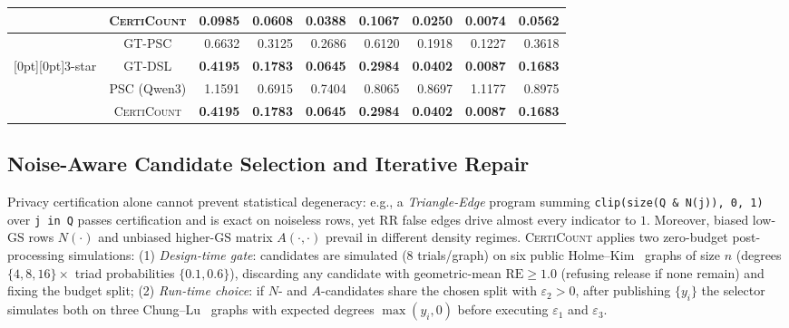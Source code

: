 \documentclass[conference]{IEEEtran}
\theoremstyle{ieeeitalic}
\newcommand{\GS}{\mathrm{GS}}
\newcommand{\RE}{\mathrm{RE}}
\begin{document}
\begin{table}[t]
\begin{tabular}{ccrrrrrrr}
 & \textsc{CertiCount} & \textbf{0.0985} & \textbf{0.0608} & \textbf{0.0388} & \textbf{0.1067} & \textbf{0.0250} & \textbf{0.0074} & \textbf{0.0562} \\
\midrule
 & GT-PSC & 0.6632 & 0.3125 & 0.2686 & 0.6120 & 0.1918 & 0.1227 & 0.3618 \\
\raisebox{-1.2ex}[0pt][0pt]{3-star} & GT-DSL & \textbf{0.4195} & \textbf{0.1783} & \textbf{0.0645} & \textbf{0.2984} & \textbf{0.0402} & \textbf{0.0087} & \textbf{0.1683} \\
 & PSC (Qwen3) & 1.1591 & 0.6915 & 0.7404 & 0.8065 & 0.8697 & 1.1177 & 0.8975 \\
 & \textsc{CertiCount} & \textbf{0.4195} & \textbf{0.1783} & \textbf{0.0645} & \textbf{0.2984} & \textbf{0.0402} & \textbf{0.0087} & \textbf{0.1683} \\
\bottomrule
\end{tabular}
\par{}
\vspace{-4pt}
\end{table}

\subsection{Noise-Aware Candidate Selection and Iterative Repair}
\label{sec:selection}

Privacy certification alone cannot prevent statistical degeneracy: e.g., a \emph{Triangle-Edge} program summing \texttt{clip(size(Q \& N(j)), 0, 1)} over \texttt{j in Q} passes certification and is exact on noiseless rows, yet RR false edges drive almost every indicator to $1$. Moreover, biased low-$\GS$ rows $N(\cdot)$ and unbiased higher-$\GS$ matrix $A(\cdot,\cdot)$ prevail in different density regimes. \textsc{CertiCount} applies two zero-budget post-processing simulations:
(1) \emph{Design-time gate}: candidates are simulated ($8$ trials/graph) on six public Holme--Kim~\cite{holme2002growing} graphs of size $n$ (degrees $\{4,8,16\} \times$ triad probabilities $\{0.1,0.6\}$), discarding any candidate with geometric-mean $\RE \ge 1.0$ (refusing release if none remain) and fixing the budget split;
(2) \emph{Run-time choice}: if $N$- and $A$-candidates share the chosen split with $\varepsilon_2 > 0$, after publishing $\{y_i\}$ the selector simulates both on three Chung--Lu~\cite{chung2002connected} graphs with expected degrees $\max(y_i, 0)$ before executing $\varepsilon_1$ and $\varepsilon_3$.
\end{document}

